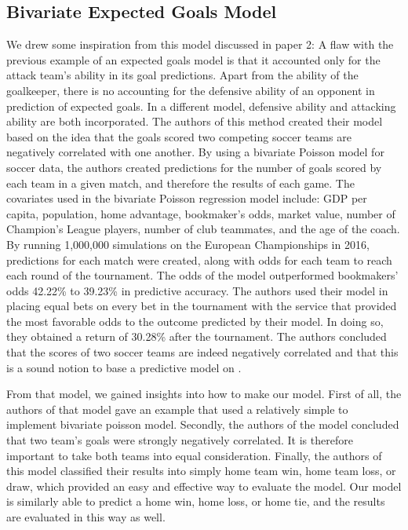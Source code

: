\documentclass[sigconf]{acmart}
\begin{document}
\subsection{Bivariate Expected Goals Model}
We drew some inspiration from this model discussed in paper 2: A flaw with the previous example of an expected goals model is that it accounted only for the attack team's ability in its goal predictions. Apart from the ability of the goalkeeper, there is no accounting for the defensive ability of an opponent in prediction of expected goals. In a different model, defensive ability and attacking ability are both incorporated. The authors of this method created their model based on the idea that the goals scored two competing soccer teams are negatively correlated with one another. By using a bivariate Poisson model for soccer data, the authors created predictions for the number of goals scored by each team in a given match, and therefore the results of each game\cite{BivariateExpected}. The covariates used in the bivariate Poisson regression model include: GDP per capita, population, home advantage, bookmaker's odds, market value, number of Champion's League players, number of club teammates, and the age of the coach. By running 1,000,000 simulations on the European Championships in 2016, predictions for each match were created, along with odds for each team to reach each round of the tournament. The odds of the model outperformed bookmakers' odds 42.22\% to 39.23\% in predictive accuracy\cite{BivariateExpected}. The authors used their model in placing equal bets on every bet in the tournament with the service that provided the most favorable odds to the outcome predicted by their model. In doing so, they obtained a return of 30.28\% after the tournament. The authors concluded that the scores of two soccer teams are indeed negatively correlated and that this is a sound notion to base a predictive model on \cite{BivariateExpected}. \cite{paper2}

From that model, we gained insights into how to make our model. First of all, the authors of that model gave an example that used a relatively simple to implement bivariate poisson model. Secondly, the authors of the model concluded that two team's goals were strongly negatively correlated. It is therefore important to take both teams into equal consideration. Finally, the authors of this model classified their results into simply home team win, home team loss, or draw, which provided an easy and effective way to evaluate the model. Our model is similarly able to predict a home win, home loss, or home tie, and the results are evaluated in this way as well.
\end{document}
